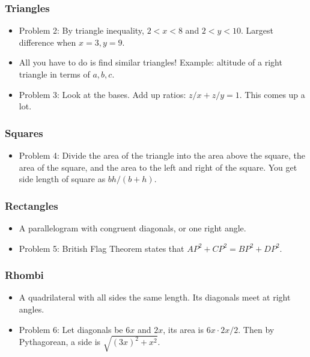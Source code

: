 \documentclass[10pt,paper=letter]{scrartcl}
\begin{document}
\subsubsection*{Triangles}

\begin{itemize}
  \item Problem 2: By triangle inequality, $2 < x < 8$ and $2 < y < 10$. Largest difference when $x = 3, y = 9$.
  \item All you have to do is find similar triangles! Example: altitude of a right triangle in terms of $a, b, c$.
  \item Problem 3: Look at the bases. Add up ratios: $z/x + z/y = 1$. This comes up a lot.
\end{itemize}

\subsubsection*{Squares}

\begin{itemize}
  \item Problem 4: Divide the area of the triangle into the area above the square, the area of the square, and the area to the left and right of the square. You get side length of square as $bh/(b+h)$.
\end{itemize}

\subsubsection*{Rectangles}

\begin{itemize}
  \item A parallelogram with congruent diagonals, or one right angle. 
  \item Problem 5: British Flag Theorem states that $AP^2 + CP^2 = BP^2 + DP^2$.
\end{itemize}

\subsubsection*{Rhombi}

\begin{itemize}
  \item A quadrilateral with all sides the same length. Its diagonals meet at right angles.
  \item Problem 6: Let diagonals be $6x$ and $2x$, its area is $6x \cdot 2x / 2$. Then by Pythagorean, a side is $\sqrt{(3x)^2 + x^2}$.
\end{itemize}
\end{document}
